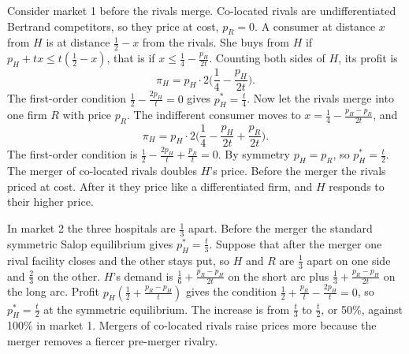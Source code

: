 Consider market 1 before the rivals merge. Co-located rivals are undifferentiated Bertrand competitors, so they
price at cost, $p_{R}=0$. A consumer at distance $x$ from $H$ is at distance $\frac{1}{2}-x$ from the rivals. She
buys from $H$ if $p_H+tx\le t(\frac{1}{2}-x)$, that is if $x\le\frac{1}{4}-\frac{p_H}{2t}$. Counting both sides of
$H$, its profit is
\begin{equation*}
\pi_H=p_H\cdot2\Big(\frac{1}{4}-\frac{p_H}{2t}\Big).
\end{equation*}
The first-order condition $\frac{1}{2}-\frac{2p_H}{t}=0$ gives $p_H^*=\frac{t}{4}$. Now let the rivals merge into
one firm $R$ with price $p_R$. The indifferent consumer moves to $x=\frac{1}{4}-\frac{p_H-p_R}{2t}$, and
\begin{equation*}
\pi_H=p_H\cdot2\Big(\frac{1}{4}-\frac{p_H}{2t}+\frac{p_R}{2t}\Big).
\end{equation*}
The first-order condition is $\frac{1}{2}-\frac{2p_H}{t}+\frac{p_R}{t}=0$. By symmetry $p_H=p_R$, so
$p_H^*=\frac{t}{2}$. The merger of co-located rivals doubles $H$'s price. Before the merger the rivals priced at
cost. After it they price like a differentiated firm, and $H$ responds to their higher price.

In market 2 the three hospitals are $\frac{1}{3}$ apart. Before the merger the standard symmetric Salop
equilibrium gives $p_H^*=\frac{t}{3}$. Suppose that after the merger one rival facility closes and the other stays
put, so $H$ and $R$ are $\frac{1}{3}$ apart on one side and $\frac{2}{3}$ on the other. $H$'s demand is
$\frac{1}{6}+\frac{p_R-p_H}{2t}$ on the short arc plus $\frac{1}{3}+\frac{p_R-p_H}{2t}$ on the long arc. Profit
$p_H(\frac{1}{2}+\frac{p_R-p_H}{t})$ gives the condition $\frac{1}{2}+\frac{p_R}{t}-\frac{2p_H}{t}=0$, so
$p_H^*=\frac{t}{2}$ at the symmetric equilibrium. The increase is from $\frac{t}{3}$ to $\frac{t}{2}$, or 50\%,
against 100\% in market 1. Mergers of co-located rivals raise prices more because the merger removes a fiercer
pre-merger rivalry.

